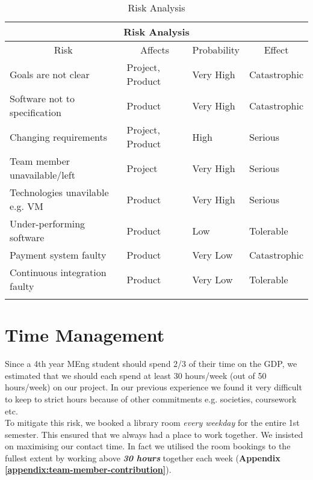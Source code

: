 \begin{center}

\begin{longtable}{ |p{6cm}|p{1.9cm}|p{2.2cm}|p{2.6cm}| }

 \hline
 	\multicolumn{4}{|c|}{Risk Analysis} \\
  \hline
  	\multicolumn{1}{|c|}{Risk} &
  	\multicolumn{1}{|c|}{Affects} &
  	\multicolumn{1}{|c|}{Probability} &
  	\multicolumn{1}{|c|}{Effect}  \\
  \hline
 	 Goals are not clear & Project, Product & Very High & Catastrophic \\
   \hline
   Software not to specification & Product & Very High & Catastrophic \\
   \hline
   Changing requirements & Project, Product & High & Serious \\
  \hline
  Team member unavailable/left & Project & Very High & Serious \\
  \hline
  Technologies unavilable e.g. VM & Product & Very High & Serious \\
  \hline
  Under-performing software & Product & Low & Tolerable \\
  \hline
  Payment system faulty & Product & Very Low & Catastrophic \\
  \hline
  Continuous integration faulty & Product & Very Low & Tolerable \\
  \hline
  \caption{Risk Analysis}
  \label{tab:risk}
\end{longtable}

\end{center}
\vspace{-1cm}

\section{Time Management}
\label{sec:time-management}
Since a 4th year MEng student should spend 2/3 of their time on the GDP, we estimated that we should each spend at least 30 hours/week (out of 50 hours/week) on our project. In our previous experience we found it very difficult to keep to strict hours because of other commitments e.g. societies, coursework etc.\\

To mitigate this risk, we booked a library room \textit{every weekday} for the entire 1st semester. This ensured that we always had a place to work together. We insisted on maximising our contact time. In fact we utilised the room bookings to the fullest extent by working above \textit{\textbf{30 hours}} together each week (\textbf{Appendix \ref{appendix:team-member-contribution}}).\\

